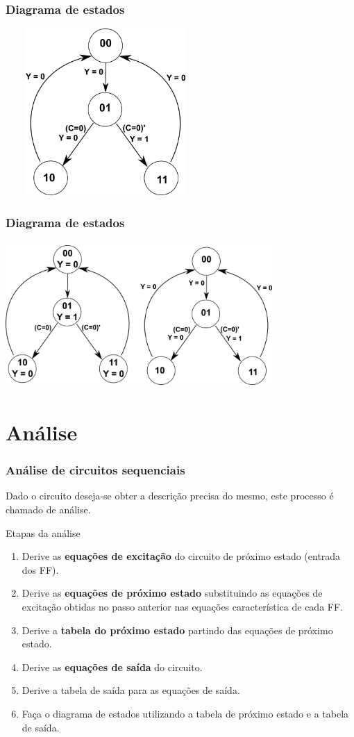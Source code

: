 \documentclass{beamer}
\begin{document}
\begin{frame}
  \frametitle{Diagrama de estados}
    \includegraphics[height = 2.5in, width = 3in]{mealyvsmoore_5.png}
\end{frame}

\begin{frame}
  \frametitle{Diagrama de estados}
    \includegraphics[height = 2.2in, width = 4in]{mealyvsmoore_6.png}
\end{frame}

\section{Análise}
\begin{frame}
  \frametitle{Análise de circuitos sequenciais}
  Dado o circuito deseja-se obter a descrição precisa do mesmo, este processo é chamado de análise.
  \begin{block}{Etapas da análise}
   \begin{enumerate}
    \item Derive as \textbf{equações de excitação} do circuito de próximo estado (entrada dos FF).\pause
    \item Derive as \textbf{equações de próximo estado} substituindo as equações de excitação obtidas no passo anterior nas equações característica de cada FF.\pause
    \item Derive a \textbf{tabela do próximo estado} partindo das equações de próximo estado.\pause
    \item Derive as \textbf{equações de saída} do circuito.\pause
    \item Derive a tabela de saída para as equações de saída.\pause
    \item Faça o diagrama de estados utilizando a tabela de próximo estado e a tabela de saída.
   \end{enumerate}
  \end{block}
\end{frame}
\end{document}
